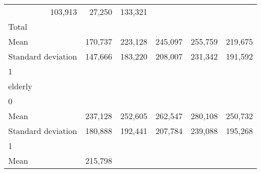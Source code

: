 \begin{tabular}{llllll}
  \multicolumn{1}{r}{103,913} &
  \multicolumn{1}{r}{27,250} &
  \multicolumn{1}{r}{133,321} \\
\multicolumn{1}{l}{\hspace{3em}Total} &
  \multicolumn{1}{|r}{} &
  \multicolumn{1}{r}{} &
  \multicolumn{1}{r}{} &
  \multicolumn{1}{r}{} &
  \multicolumn{1}{r}{} \\
\multicolumn{1}{l}{\hspace{4em}Mean} &
  \multicolumn{1}{|r}{170,737} &
  \multicolumn{1}{r}{223,128} &
  \multicolumn{1}{r}{245,097} &
  \multicolumn{1}{r}{255,759} &
  \multicolumn{1}{r}{219,675} \\
\multicolumn{1}{l}{\hspace{4em}Standard deviation} &
  \multicolumn{1}{|r}{147,666} &
  \multicolumn{1}{r}{183,220} &
  \multicolumn{1}{r}{208,007} &
  \multicolumn{1}{r}{231,342} &
  \multicolumn{1}{r}{191,592} \\
\multicolumn{1}{l}{\hspace{1em}1} &
  \multicolumn{1}{|r}{} &
  \multicolumn{1}{r}{} &
  \multicolumn{1}{r}{} &
  \multicolumn{1}{r}{} &
  \multicolumn{1}{r}{} \\
\multicolumn{1}{l}{\hspace{2em}elderly} &
  \multicolumn{1}{|r}{} &
  \multicolumn{1}{r}{} &
  \multicolumn{1}{r}{} &
  \multicolumn{1}{r}{} &
  \multicolumn{1}{r}{} \\
\multicolumn{1}{l}{\hspace{3em}0} &
  \multicolumn{1}{|r}{} &
  \multicolumn{1}{r}{} &
  \multicolumn{1}{r}{} &
  \multicolumn{1}{r}{} &
  \multicolumn{1}{r}{} \\
\multicolumn{1}{l}{\hspace{4em}Mean} &
  \multicolumn{1}{|r}{237,128} &
  \multicolumn{1}{r}{252,605} &
  \multicolumn{1}{r}{262,547} &
  \multicolumn{1}{r}{280,108} &
  \multicolumn{1}{r}{250,732} \\
\multicolumn{1}{l}{\hspace{4em}Standard deviation} &
  \multicolumn{1}{|r}{180,888} &
  \multicolumn{1}{r}{192,441} &
  \multicolumn{1}{r}{207,784} &
  \multicolumn{1}{r}{239,088} &
  \multicolumn{1}{r}{195,268} \\
\multicolumn{1}{l}{\hspace{3em}1} &
  \multicolumn{1}{|r}{} &
  \multicolumn{1}{r}{} &
  \multicolumn{1}{r}{} &
  \multicolumn{1}{r}{} &
  \multicolumn{1}{r}{} \\
\multicolumn{1}{l}{\hspace{4em}Mean} &
  \multicolumn{1}{|r}{215,798} &

\end{tabular}
